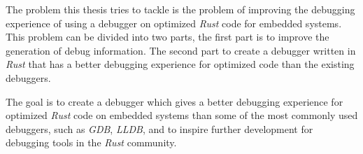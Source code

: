  

The problem this thesis tries to tackle is the problem of improving the debugging experience of using a debugger on optimized \emph{Rust} code for embedded systems.
This problem can be divided into two parts, the first part is to improve the generation of debug information.
The second part to create a debugger written in \emph{Rust} that has a better debugging experience for optimized code than the existing debuggers.


The goal is to create a debugger which gives a better debugging experience for optimized \emph{Rust} code on embedded systems than some of the most commonly used debuggers, such as \emph{GDB}, \emph{LLDB}, and to inspire further development for debugging tools in the \emph{Rust} community.


